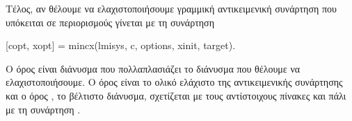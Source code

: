 \begin{enumerate}
        Τέλος, αν θέλουμε να ελαχιστοποιήσουμε γραμμική αντικειμενική συνάρτηση
        που υπόκειται σε  περιορισμούς γίνεται με τη συνάρτηση
        \begin{otherlanguage}{english}
            \begin{center}
                [copt, xopt] = mincx(lmisys, c, options, xinit, target).
            \end{center}
        \end{otherlanguage}
        Ο όρος  είναι διάνυσμα που πολλαπλασιάζει το διάνυσμα που
        θέλουμε να ελαχιστοποιήσουμε. Ο όρος  είναι το ολικό ελάχιστο
        της αντικειμενικής συνάρτησης και ο όρος , το βέλτιστο
        διάνυσμα, σχετίζεται με τους αντίστοιχους πίνακες  και πάλι με
        τη συνάρτηση .
\end{enumerate}

